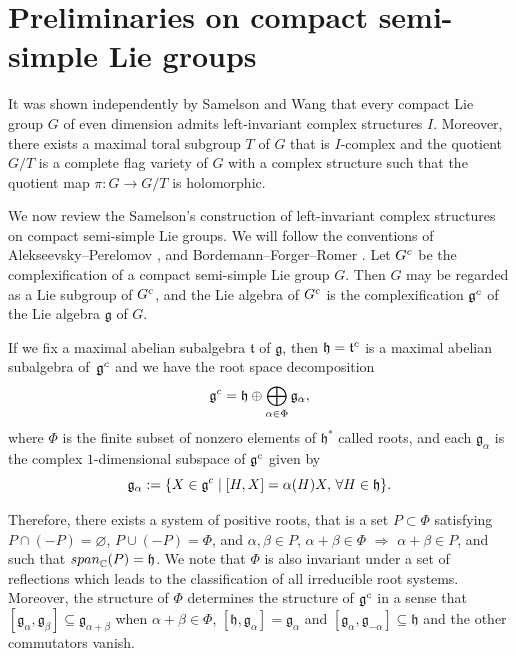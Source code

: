\documentclass[11pt]{article}
\numberwithin{equation}{section}
\numberwithin{equation}{section}
\begin{document}
\setcounter{section}{1}
\section{Preliminaries on compact semi-simple Lie groups}
It was shown independently by Samelson \cite{Samelson} and Wang \cite{Wang} that every compact Lie group $G$ of even dimension admits left-invariant complex structures $I$.
Moreover, there exists a maximal toral subgroup $T$ of $G$ that is $I$-complex and the quotient $G/T$
is a complete flag variety of $G$ with a complex structure such that the quotient map $\pi\colon G \rightarrow G/T$ is holomorphic.

We now review the Samelson's construction of left-invariant complex structures on compact semi-simple Lie groups.
We will follow the conventions of Alekseevsky--Perelomov \cite{AlP}, and Bordemann--Forger--Romer \cite{BFR}.
 Let $G^{\rm c}$ be the complexification of a compact semi-simple Lie group $G$. Then $G$ may be regarded as a Lie subgroup of $G^{\rm c}$, and the Lie algebra of $G^{\rm c}$ is the complexification $\mathfrak g^{\rm c}$ of the Lie algebra $\mathfrak g$ of $G$.

If we fix a maximal abelian subalgebra $\mathfrak t$ of $\mathfrak g$, then $\mathfrak h= \mathfrak t^{\rm c}$ is a maximal abelian subalgebra of~$\mathfrak g^{\rm c}$ and we have the root space decomposition
\[
\mathfrak g^{\rm c} = \mathfrak{h} \oplus \bigoplus_{\alpha \in \Phi} \mathfrak g_{\alpha},
\]
where $\Phi$ is the finite subset of nonzero elements of ${\mathfrak h}^*$ called roots, and each $\mathfrak g_{\alpha}$ is the complex $1$-dimensional subspace of $\mathfrak g^{\rm c} $ given by
\[
\mathfrak g_{\alpha} := \{ X \in {\mathfrak g}^{\rm c} \mid [H , X] = \alpha (H) X, \, \forall H \in \mathfrak{h} \}.
\]

Therefore, there exists a system of positive roots, that is a set $P \subset \Phi$ satisfying $P \cap (- P) = \varnothing$, $ P \cup (-P)=\Phi$, and $\alpha, \beta \in P$, $ \alpha + \beta \in \Phi$ $\Rightarrow$ $\alpha + \beta \in P$, and such that ${\rm {span}}_{\mathbb C}(P) = \mathfrak h$. We note that $\Phi$ is also invariant under a set of reflections which leads to the classification of all irreducible root systems. Moreover, the structure of $\Phi$ determines the structure of $\mathfrak g^{\rm c}$ in a sense that $[\mathfrak g_{\alpha}, \mathfrak g_{\beta}] \subseteq \mathfrak g_{\alpha +\beta}$ when $\alpha+\beta \in \Phi$, $[\mathfrak h,\mathfrak g_{\alpha}] = \mathfrak g_{\alpha}$ and $[\mathfrak g_{\alpha}, \mathfrak g_{-\alpha}] \subseteq \mathfrak h$ and the other commutators vanish.
\end{document}
